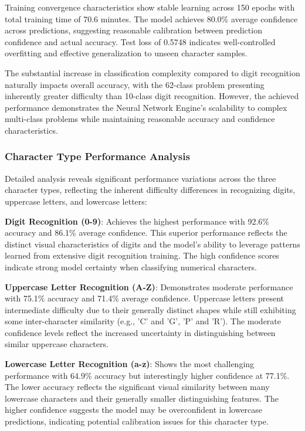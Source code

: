 \documentclass[11pt,a4paper]{report}
\begin{document}
Training convergence characteristics show stable learning across 150 epochs with total training time of 70.6 minutes. The model achieves 80.0\% average confidence across predictions, suggesting reasonable calibration between prediction confidence and actual accuracy. Test loss of 0.5748 indicates well-controlled overfitting and effective generalization to unseen character samples.

The substantial increase in classification complexity compared to digit recognition naturally impacts overall accuracy, with the 62-class problem presenting inherently greater difficulty than 10-class digit recognition. However, the achieved performance demonstrates the Neural Network Engine's scalability to complex multi-class problems while maintaining reasonable accuracy and confidence characteristics.

\subsubsection{Character Type Performance Analysis}

Detailed analysis reveals significant performance variations across the three character types, reflecting the inherent difficulty differences in recognizing digits, uppercase letters, and lowercase letters:

\textbf{Digit Recognition (0-9)}: Achieves the highest performance with 92.6\% accuracy and 86.1\% average confidence. This superior performance reflects the distinct visual characteristics of digits and the model's ability to leverage patterns learned from extensive digit recognition training. The high confidence scores indicate strong model certainty when classifying numerical characters.

\textbf{Uppercase Letter Recognition (A-Z)}: Demonstrates moderate performance with 75.1\% accuracy and 71.4\% average confidence. Uppercase letters present intermediate difficulty due to their generally distinct shapes while still exhibiting some inter-character similarity (e.g., 'C' and 'G', 'P' and 'R'). The moderate confidence levels reflect the increased uncertainty in distinguishing between similar uppercase characters.

\textbf{Lowercase Letter Recognition (a-z)}: Shows the most challenging performance with 64.9\% accuracy but interestingly higher confidence at 77.1\%. The lower accuracy reflects the significant visual similarity between many lowercase characters and their generally smaller distinguishing features. The higher confidence suggests the model may be overconfident in lowercase predictions, indicating potential calibration issues for this character type.
\end{document}
